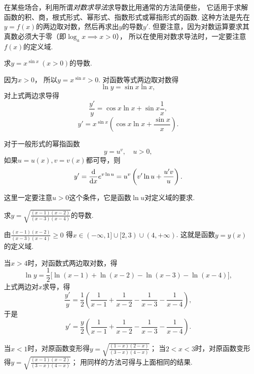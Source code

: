 在某些场合，利用所谓\emph{对数求导法}求导数比用通常的方法简便些，
它适用于求解函数的积、商，根式形式、幂形式、指数形式或幂指形式的函数.
这种方法是先在\(y=f(x)\)的两边取对数，然后再求出\(y\)的导数\(y'\).
但要注意，因为对数运算要求其真数必须大于零（即\(\log_a x \implies x>0\)），
所以在使用对数求导法时，一定要注意\(f(x)\)的定义域.

\begin{example}
求\(y=x^{\sin x}\ (x>0)\)的导数.
\begin{solution}
因为\(x > 0\)，
所以\(y=x^{\sin x} > 0\).
对函数等式两边取对数得\[
	\ln y = \sin x \ln x,
\]
对上式两边求导得\[
	\frac{y'}{y} = \cos x \ln x + \sin x \frac{1}{x},
\]\[
	y' = x^{\sin x} \left( \cos x \ln x + \frac{\sin x}{x} \right).
\]
\end{solution}
\end{example}

\begin{theorem}
对于一般形式的幂指函数\[
	y = u^v, \quad u > 0,
\]
如果\(u=u(x),v=v(x)\)都可导，则\[
	y' = \dv{x}e^{v \ln u} = u^v \left( v' \ln u + \frac{u'v}{u} \right).
\]
\end{theorem}
这里一定要注意\(u>0\)这个条件，它是函数\(\ln u\)对定义域的要求.

\begin{example}
求\(y=\sqrt{\frac{(x-1)(x-2)}{(x-3)(x-4)}}\)的导数.
\begin{solution}
由\(\frac{(x-1)(x-2)}{(x-3)(x-4)}\geq0\)
得\(x \in (-\infty,1]\cup[2,3)\cup(4,+\infty)\).
这就是函数\(y=y(x)\)的定义域.

当\(x>4\)时，对函数式两边取对数，得\[
	\ln y = \frac{1}{2} \bigl[
		\ln(x-1)+\ln(x-2)-\ln(x-3)-\ln(x-4)
	\bigr],
\]
上式两边对\(x\)求导，得\[
	\frac{y'}{y} = \frac{1}{2} \left(
		\frac{1}{x-1} + \frac{1}{x-2} - \frac{1}{x-3} - \frac{1}{x-4}
	\right),
\]
于是\[
	y' = \frac{y}{2} \left(
		\frac{1}{x-1} + \frac{1}{x-2} - \frac{1}{x-3} - \frac{1}{x-4}
	\right).
\]

当\(x<1\)时，对原函数变形得\(y=\sqrt{\frac{(1-x)(2-x)}{(3-x)(4-x)}}\)；
当\(2<x<3\)时，对原函数变形得\(y=\sqrt{\frac{(x-1)(x-2)}{(3-x)(4-x)}}\)；
用同样的方法可得与上面相同的结果.
\end{solution}
\end{example}

